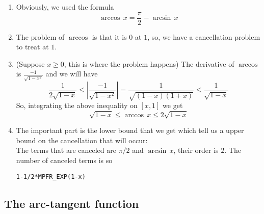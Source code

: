 \documentclass[12pt]{amsart}
\begin{document}
\begin{enumerate}
\item Obviously, we used the formula 
\begin{equation*}
\arccos\,x=\frac{\pi}{2}-\arcsin\,x
\end{equation*}
\item The problem of $\arccos$ is that it is $0$ at $1$, so, we have a cancellation problem to treat at $1$.
\item (Suppose $x\geq 0$, this is where the problem happens) The derivative of $\arccos$ is $\frac{-1}{\sqrt{1-x^2}}$ and we will have
\begin{equation*}
\frac{1}{2\sqrt{1-x}}  \leq   |\frac{-1}{\sqrt{1-x^2}}|=\frac{1}{\sqrt{(1-x)(1+x)}}  \leq  \frac{1}{\sqrt{1-x}}
\end{equation*}
So, integrating the above inequality on $[x,1]$ we get
\begin{equation*}
\sqrt{1-x}\leq \arccos\,x\leq 2\sqrt{1-x}
\end{equation*}
\item The important part is the lower bound that we get which tell us a upper bound on the cancellation that will occur:\\
The terms that are canceled are $\pi/2$ and $\arcsin\,x$, their order is $2$. The number of canceled terms is so
\begin{verbatim}
1-1/2*MPFR_EXP(1-x)
\end{verbatim}
\end{enumerate}

\subsection{The arc-tangent function} %
\end{document}
